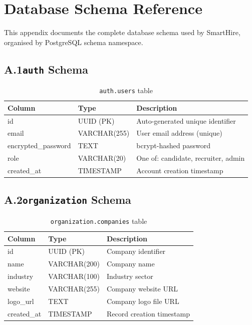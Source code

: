 \appendix
\chapter{Database Schema Reference}
\label{app:schema}

This appendix documents the complete database schema used by SmartHire, organised by PostgreSQL schema namespace.

\section*{A.1\quad \texttt{auth} Schema}

\begin{table}[htbp]
\centering
\caption{\texttt{auth.users} table}
\small
\begin{tabular}{p{1.5in}p{1.2in}p{2.8in}}
\toprule
\textbf{Column} & \textbf{Type} & \textbf{Description} \\
\midrule
id               & UUID (PK)     & Auto-generated unique identifier \\
email            & VARCHAR(255)  & User email address (unique) \\
encrypted\_password & TEXT       & bcrypt-hashed password \\
role             & VARCHAR(20)   & One of: candidate, recruiter, admin \\
created\_at      & TIMESTAMP     & Account creation timestamp \\
\bottomrule
\end{tabular}
\end{table}

\section*{A.2\quad \texttt{organization} Schema}

\begin{table}[htbp]
\centering
\caption{\texttt{organization.companies} table}
\small
\begin{tabular}{p{1.5in}p{1.2in}p{2.8in}}
\toprule
\textbf{Column} & \textbf{Type} & \textbf{Description} \\
\midrule
id         & UUID (PK)     & Company identifier \\
name       & VARCHAR(200)  & Company name \\
industry   & VARCHAR(100)  & Industry sector \\
website    & VARCHAR(255)  & Company website URL \\
logo\_url  & TEXT          & Company logo file URL \\
created\_at & TIMESTAMP    & Record creation timestamp \\
\bottomrule
\end{tabular}
\end{table}

